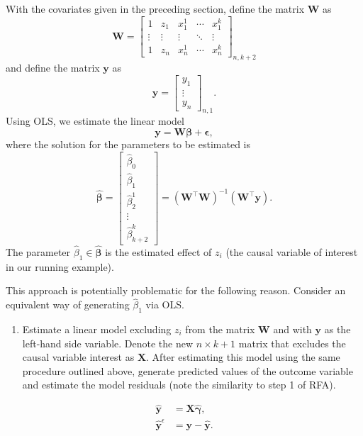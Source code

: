 \documentclass[11pt,]{article}
\providecommand{\tightlist}{%
\setlength{\itemsep}{0pt}\setlength{\parskip}{0pt}}
\begin{document}
With the covariates given in the preceding section, define the matrix
\(\mathbf{W}\) as \[
\mathbf{W} = 
\begin{bmatrix}
1 & z_1 & x_1^1 & \cdots & x_1^k \\
\vdots & \vdots & \vdots & \ddots & \vdots \\
1 & z_n & x_n^1 & \cdots & x_n^k
\end{bmatrix}_{n,k+2}\tag{5}
\] and define the matrix \(\mathbf{y}\) as \[
\mathbf{y} = 
\begin{bmatrix}
y_1 \\
\vdots \\
y_n
\end{bmatrix}_{n,1}.\tag{6}
\] Using OLS, we estimate the linear model
\[\mathbf{y} = \mathbf{W}\boldsymbol{\beta} + \boldsymbol{\epsilon},\]
where the solution for the parameters to be estimated is \[
\hat{\boldsymbol{\beta}} = 
\begin{bmatrix}
\hat{\beta}_0 \\
\hat{\beta}_1 \\
\hat{\beta}_2^1 \\
\vdots \\
\hat{\beta}_{k+2}^k
\end{bmatrix} = (\mathbf{W}^\top\mathbf{W})^{-1} (\mathbf{W}^\top \mathbf{y}).\tag{7}
\] The parameter \(\hat{\beta}_1 \in \hat{\boldsymbol{\beta}}\) is the
estimated effect of \(z_i\) (the causal variable of interest in our
running example).

This approach is potentially problematic for the following reason.
Consider an equivalent way of generating \(\hat{\beta}_1\) via OLS.

\begin{enumerate}
\def\labelenumi{\arabic{enumi}.}
\tightlist
\item
  Estimate a linear model excluding \(z_i\) from the matrix
  \(\mathbf{W}\) and with \(\mathbf{y}\) as the left-hand side variable.
  Denote the new \(n \times k + 1\) matrix that excludes the causal
  variable interest as \(\mathbf{X}\). After estimating this model using
  the same procedure outlined above, generate predicted values of the
  outcome variable and estimate the model residuals (note the similarity
  to step 1 of RFA).
\end{enumerate}

\[
\begin{aligned}
\hat{\mathbf{y}} & = \mathbf{X}\hat{\boldsymbol{\gamma}}, \\
\hat{\mathbf{y}}^\epsilon & = \mathbf{y} -  \hat{\mathbf{y}}.
\end{aligned}\tag{8}
\]
\end{document}
